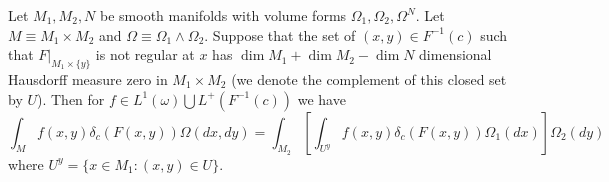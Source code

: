 \begin{theorem}
Let $M_1,M_2,N$ be smooth manifolds with volume forms $\Omega_1,\Omega_2, \Omega^N$. Let $M\equiv M_1\times M_2$ and $\Omega\equiv \Omega_1\wedge\Omega_2$. Suppose that the set of $(x,y)\in F^{-1}(c)$ such that $F|_{M_1\times\{y\}}$ is not regular at $x$ has $\dim M_1+\dim M_2-\dim N$ dimensional Hausdorff measure zero in $M_1\times M_2$ (we denote the complement of this closed set by $U$).  Then for $f\in L^1(\omega)\bigcup L^+(F^{-1}(c))$ we have
\begin{equation}\label{Fubini_eq}
\int_Mf(x,y)\delta_c(F(x,y)) \Omega(dx,dy)=\int_{M_2}\left[\int_{U^y} f(x,y) \delta_c(F(x,y))\Omega_1(dx) \right]\Omega_2(dy)
\end{equation}
where $U^y=\{x\in M_1:(x,y)\in U\}$.
\end{theorem}
